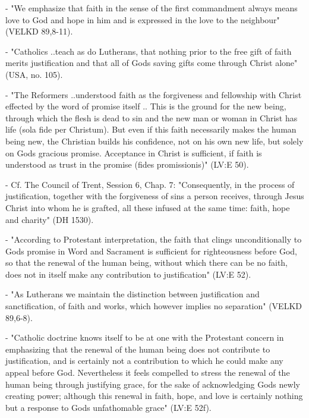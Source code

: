 - "We emphasize that faith in the sense of the first commandment always
means love to God and hope in him and is expressed in the love to the
neighbour" (VELKD 89,8-11).

- "Catholics ..teach as do Lutherans, that nothing prior to the free
gift of faith merits justification and that all of God\textquotesingle s
saving gifts come through Christ alone" (USA, no. 105).

- "The Reformers ..understood faith as the forgiveness and fellowship
with Christ effected by the word of promise itself .. This is the ground
for the new being, through which the flesh is dead to sin and the new
man or woman in Christ has life (sola fide per Christum). But even if
this faith necessarily makes the human being new, the Christian builds
his confidence, not on his own new life, but solely on
God\textquotesingle s gracious promise. Acceptance in Christ is
sufficient, if \textquotesingle faith\textquotesingle{} is understood as
\textquotesingle trust in the promise\textquotesingle{} (fides
promissionis)" (LV:E 50).

- Cf. The Council of Trent, Session 6, Chap. 7: "Consequently, in the
process of justification, together with the forgiveness of sins a person
receives, through Jesus Christ into whom he is grafted, all these
infused at the same time: faith, hope and charity" (DH 1530).

- "According to Protestant interpretation, the faith that clings
unconditionally to God\textquotesingle s promise in Word and Sacrament
is sufficient for righteousness before God, so that the renewal of the
human being, without which there can be no faith, does not in itself
make any contribution to justification" (LV:E 52).

- "As Lutherans we maintain the distinction between justification and
sanctification, of faith and works, which however implies no separation"
(VELKD 89,6-8).

- "Catholic doctrine knows itself to be at one with the Protestant
concern in emphasizing that the renewal of the human being does not
\textquotesingle contribute\textquotesingle{} to justification, and is
certainly not a contribution to which he could make any appeal before
God. Nevertheless it feels compelled to stress the renewal of the human
being through justifying grace, for the sake of acknowledging
God\textquotesingle s newly creating power; although this renewal in
faith, hope, and love is certainly nothing but a response to
God\textquotesingle s unfathomable grace" (LV:E 52f).


